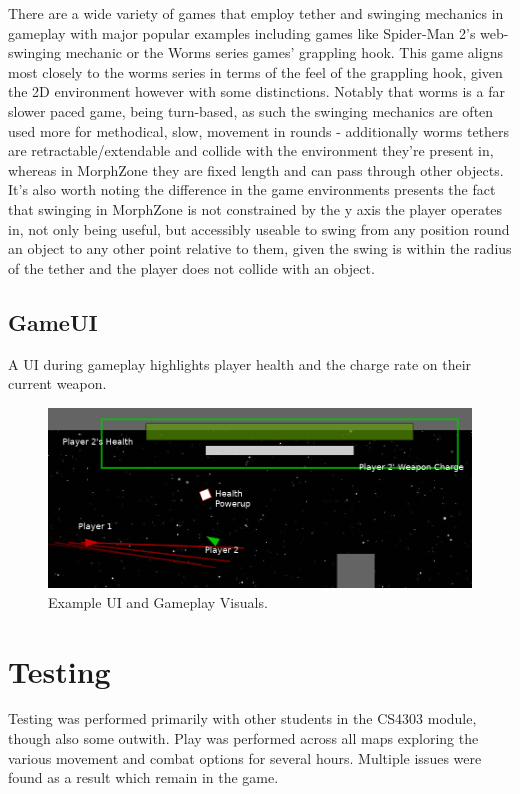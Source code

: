 \documentclass[10pt,a4paper]{article}
\begin{document}
There are a wide variety of games that employ tether and swinging mechanics in gameplay with major popular examples including games like Spider-Man 2's web-swinging mechanic or the Worms series games' grappling hook. This game aligns most closely to the worms series in terms of the feel of the grappling hook, given the 2D environment however with some distinctions. Notably that worms is a far slower paced game, being turn-based, as such the swinging mechanics are often used more for methodical, slow, movement in rounds - additionally worms tethers are retractable/extendable and collide with the environment they're present in, whereas in MorphZone they are fixed length and can pass through other objects. It's also worth noting the difference in the game environments presents the fact that swinging in MorphZone is not constrained by the y axis the player operates in, not only being useful, but accessibly useable to swing from any position round an object to any other point relative to them, given the swing is within the radius of the tether and the player does not collide with an object.

\subsection{GameUI}

A UI during gameplay highlights player health and the charge rate on their current weapon.

\begin{figure}[!h]
\centering
  \includegraphics[width=\linewidth]{environment_screen.png}
  \caption{Example UI and Gameplay Visuals.}
  \label{fig:boat1}
\end{figure}

\section{Testing}

Testing was performed primarily with other students in the CS4303 module, though also some outwith. Play was performed across all maps exploring the various movement and combat options for several hours. Multiple issues were found as a result which remain in the game.
\end{document}
